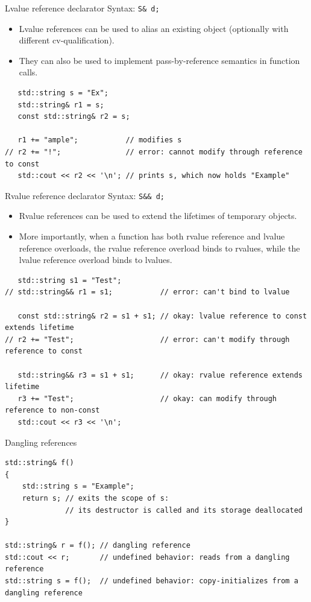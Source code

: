 \documentclass{beamer}
\begin{document}
\begin{frame}[fragile]{Lvalue reference declarator}
Syntax: \lstinline{S& d;}
\begin{itemize}
  \item Lvalue references can be used to alias an existing object (optionally
  with different cv-qualification).
  \item They can also be used to implement pass-by-reference semantics in
  function calls.
\end{itemize}
\begin{lstlisting}
   std::string s = "Ex";
   std::string& r1 = s;
   const std::string& r2 = s;
 
   r1 += "ample";           // modifies s
// r2 += "!";               // error: cannot modify through reference to const
   std::cout << r2 << '\n'; // prints s, which now holds "Example"
\end{lstlisting}
\end{frame}

\begin{frame}[fragile]{Rvalue reference declarator}
Syntax: \lstinline{S&& d;}
\begin{itemize}
  \item Rvalue references can be used to extend the lifetimes of temporary
  objects.
  \item More importantly, when a function has both rvalue reference and lvalue
  reference overloads, the rvalue reference overload binds to rvalues, while the
  lvalue reference overload binds to lvalues. 
\end{itemize}

\begin{lstlisting}
   std::string s1 = "Test";
// std::string&& r1 = s1;           // error: can't bind to lvalue
 
   const std::string& r2 = s1 + s1; // okay: lvalue reference to const extends lifetime
// r2 += "Test";                    // error: can't modify through reference to const
 
   std::string&& r3 = s1 + s1;      // okay: rvalue reference extends lifetime
   r3 += "Test";                    // okay: can modify through reference to non-const
   std::cout << r3 << '\n';
\end{lstlisting}
\end{frame}

\begin{frame}[fragile]{Dangling references}
\begin{lstlisting}
std::string& f()
{
    std::string s = "Example";
    return s; // exits the scope of s:
              // its destructor is called and its storage deallocated
}
 
std::string& r = f(); // dangling reference
std::cout << r;       // undefined behavior: reads from a dangling reference
std::string s = f();  // undefined behavior: copy-initializes from a dangling reference
\end{lstlisting}
\end{frame}
\end{document}
